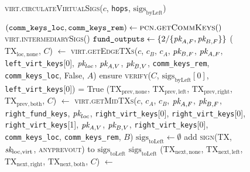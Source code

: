 \begin{figure}[H]
  \begin{processbox}{\textsc{virt.circulateVirtualSigs}($c$, \texttt{hops},
  $\mathrm{sigs}_{\mathrm{byLeft}}$)}
    \begin{algorithmic}[1]
      \State $(\texttt{comm\_keys\_loc}, \texttt{comm\_keys\_rem}) \gets
      \textsc{pcn.getCommKeys}()$
       
         
          \State \Return \textsc{virt.intermediarySigs}()
        \Else \: 
          \State $\texttt{fund\_outputs} \gets \{ 2/\{\textit{pk}_{A, F}, \textit{pk}_{B, F}\} \}$
          \State ($\mathrm{TX}_{\mathrm{loc}, \mathrm{none}}$, $C$) $\gets$
          \textsc{virt.getEdgeTXs}($c$, $c_B$, $c_A$, $\textit{pk}_{B, F}$, $\textit{pk}_{A, F}$,
          \texttt{left\_virt\_keys}[0], $\textit{pk}_{loc}$, $\textit{pk}_{A, V}$, $\textit{pk}_{B, V}$,
          \texttt{comm\_keys\_rem}, \texttt{comm\_keys\_loc}, False, $A$)
          \State ensure \textsc{verify}($C$,
          $\mathrm{sigs}_{\mathrm{byLeft}}[0]$, \texttt{left\_virt\_keys}[0]) =
          True
          \State ($\mathrm{TX}_{\mathrm{prev}, \mathrm{none}}$,
          $\mathrm{TX}_{\mathrm{prev}, \mathrm{left}}$,
          $\mathrm{TX}_{\mathrm{prev}, \mathrm{right}}$,
          $\mathrm{TX}_{\mathrm{prev}, \mathrm{both}}$, $C$) $\gets$
          \textsc{virt.getMidTXs}($c$, $c_A$, $c_B$, $\textit{pk}_{A, F}$, $\textit{pk}_{B, F}$,
          \texttt{right\_fund\_keys}, $\textit{pk}_{loc}$, \texttt{right\_virt\_keys}[0],
          \texttt{right\_virt\_keys}[0], \texttt{right\_virt\_keys}[1], $\textit{pk}_{A,
          V}$, $\textit{pk}_{B, V}$, \texttt{right\_virt\_keys}[0],
          \texttt{comm\_keys\_loc}, \texttt{comm\_keys\_rem}, $B$)
          \State $\mathrm{sigs}_{\mathrm{toLeft}} \gets \emptyset$
            \State add \textsc{sign}(TX, $\textit{sk}_{\mathrm{loc}, \mathrm{virt}}$,
            \textsc{anyprevout}) to $\mathrm{sigs}_{\mathrm{toLeft}}$
          \EndFor
          \State \Return $\mathrm{sigs}_{\mathrm{toLeft}}$
        \EndIf
      \Else \: 
        \State ($\mathrm{TX}_{\mathrm{next}, \mathrm{none}}$,
        $\mathrm{TX}_{\mathrm{next}, \mathrm{left}}$,
        $\mathrm{TX}_{\mathrm{next}, \mathrm{right}}$,
        $\mathrm{TX}_{\mathrm{next}, \mathrm{both}}$, $C$) $\gets$

\end{algorithmic}
\end{processbox}
\end{figure}
